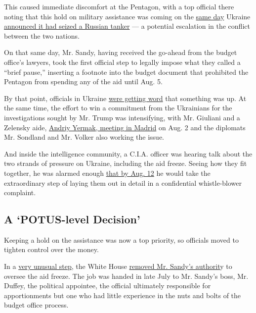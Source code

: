 This caused immediate discomfort at the Pentagon, with a top official
there noting that this hold on military assistance was coming on the
\href{https://www.facebook.com/SecurSerUkraine/photos/a.1539443172952349/2438495979713726/?type=3\&theater}{same
day} Ukraine
\href{https://www.nytimes.com/2019/07/25/world/europe/ukraine-russia-tanker.html}{announced
it had seized a Russian tanker} --- a potential escalation in the
conflict between the two nations.

On that same day, Mr. Sandy, having received the go-ahead from the
budget office's lawyers, took the first official step to legally impose
what they called a ``brief pause,'' inserting a footnote into the budget
document that prohibited the Pentagon from spending any of the aid until
Aug. 5.

By that point, officials in Ukraine
\href{https://www.nytimes.com/2019/12/03/world/europe/ukraine-impeachment-military-aid.html}{were
getting word} that something was up. At the same time, the effort to win
a commitment from the Ukrainians for the investigations sought by Mr.
Trump was intensifying, with Mr. Giuliani and a Zelensky aide,
\href{https://www.nytimes.com/2019/08/21/us/politics/giuliani-ukraine.html}{Andriy
Yermak, meeting in Madrid} on Aug. 2 and the diplomats Mr. Sondland and
Mr. Volker also working the issue.

And inside the intelligence community, a C.I.A. officer was hearing talk
about the two strands of pressure on Ukraine, including the aid freeze.
Seeing how they fit together, he was alarmed enough
\href{https://www.nytimes.com/interactive/2019/09/26/us/politics/whistle-blower-complaint.html}{that
by Aug. 12} he would take the extraordinary step of laying them out in
detail in a confidential whistle-blower complaint.

\hypertarget{a-potus-level-decision}{%
\subsection{A `POTUS-level Decision'}\label{a-potus-level-decision}}

Keeping a hold on the assistance was now a top priority, so officials
moved to tighten control over the money.

In a
\href{https://www.documentcloud.org/documents/6592845-2019-11-Mark-Sandy-Final-Redacted.html\#document/p104/a541466}{very
unusual step}, the White House
\href{https://www.documentcloud.org/documents/6592845-2019-11-Mark-Sandy-Final-Redacted.html\#document/p103/a541465}{removed
Mr. Sandy's authorit}y to oversee the aid freeze. The job was handed in
late July to Mr. Sandy's boss, Mr. Duffey, the political appointee, the
official ultimately responsible for apportionments but one who had
little experience in the nuts and bolts of the budget office process.

